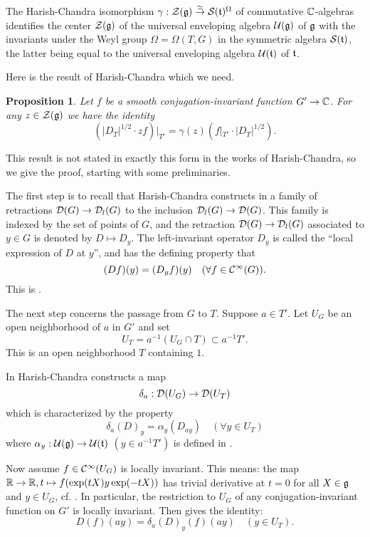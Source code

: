 \documentclass{article}
\newtheorem{pro}[thm]{Proposition}
\theoremstyle{definition}
\numberwithin{equation}{section}
\renewcommand{\-}{\hyp{}}
\begin{document}
The Harish-Chandra isomorphism  $\gamma : \mathcal{Z}(\mathfrak{g}) \overset\simeq\to \mathcal{S}(\mathfrak{t})^\Omega$ of commutative $\mathbb{C}$-algebras identifies the center $\mathcal{Z}(\mathfrak{g})$ of the universal enveloping algebra $\mathcal{U}(\mathfrak{g})$  of $\mathfrak{g}$ with the invariants under the Weyl group $\Omega=\Omega(T,G)$ in the symmetric algebra $\mathcal{S}(\mathfrak{t})$, the latter being equal to the universal enveloping algebra $\mathcal{U}(\mathfrak{t})$ of $\mathfrak{t}$.

Here is the result of Harish-Chandra which we need.

\begin{pro} \label{pro:diff}
	Let $f$ be a smooth conjugation-invariant function $G' \to \mathbb{C}$. For any $z \in \mathcal{Z}(\mathfrak{g})$ we have the identity
	\[ (|D_T|^{1/2} \cdot zf)|_{T'} =  \gamma(z)(f|_{T'} \cdot |D_T|^{1/2}). \]
\end{pro}

This result is not stated in exactly  this form in the works of Harish-Chandra, so we give the proof, starting with some preliminaries.

The first step is to recall that Harish-Chandra constructs in \cite[\S4]{HC_characters} a family of retractions $\mathcal{D}(G) \to \mathcal{D}_l(G)$ to the inclusion $\mathcal{D}_l(G) \to \mathcal{D}(G)$. This family is indexed by the set of points of $G$, and the retraction $\mathcal{D}(G) \to \mathcal{D}_l(G)$ associated to $y \in G$ is denoted by $D \mapsto D_y$. The left-invariant operator $D_y$ is called the ``local expression of $D$ at $y$'', and has the defining property that 
\begin{equation} \label{eq:diff1}
 (Df)(y) = (D_yf)(y)\quad(\forall f \in \mathcal{C}^\infty(G)).
\end{equation}
This is \cite[\S4, Corollary to Lemma 13, page 112]{HC_characters}.

The next step concerns the passage from $G$ to $T$. Suppose $a\in T'$. 
Let $U_G$ be an open neighborhood of $a$ in $G'$ and set
\[
\label{e:UT}
U_T = a^{-1}(U_G\cap T)\subset a^{-1}T'.
\]
This is an open neighborhood $T$ containing $1$.


 In \cite[\S 5]{HC_inv_eigen} Harish-Chandra constructs a map
\[ \delta_a : \mathcal{D}(U_G) \to \mathcal{D}(U_T)\]
which is characterized by the property 
\[  \delta_a(D)_y = \alpha_y(D_{ay}) \quad (\forall y \in U_T) \]
where $\alpha_y : \mathcal{U}(\mathfrak{g}) \to \mathcal{U}(\mathfrak{t})$ $(y\in a^{-1}T')$ is defined  in \cite[\S5, Corollary 1, page 463]{HC_inv_eigen}.


Now assume $f \in \mathcal{C}^\infty(U_G)$  is locally invariant. This means: the map $\mathbb{R} \to \mathbb{R}, t \mapsto f(\exp(tX)y\exp(-tX))$ has trivial derivative at $t=0$  for all $X \in \mathfrak{g}$ and $y \in U_G$, cf. \cite[\S8]{HC_inv_dist}. In particular, the restriction to $U_G$ of any conjugation-invariant function on $G'$ is locally invariant.
Then 
\cite[Lemma 18]{HC_inv_eigen} gives the identity:
\begin{equation} \label{eq:diff3}
	D(f)(ay) = \delta_a(D)_y(f)(ay)\quad(y\in U_T).
\end{equation}
\end{document}

